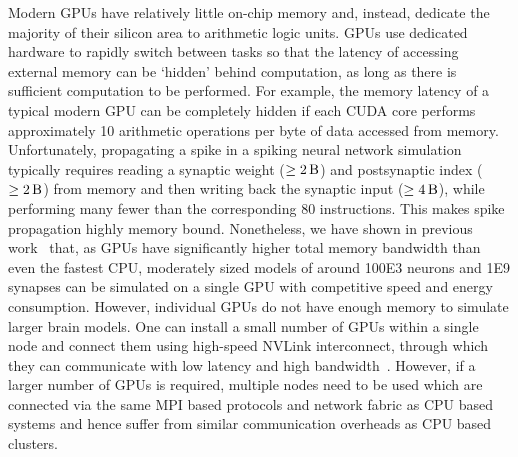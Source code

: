 \documentclass[9pt,a4paper]{amsart}
\begin{document}
Modern GPUs have relatively little on-chip memory and, instead, dedicate the majority of their silicon area to arithmetic logic units.
GPUs use dedicated hardware to rapidly switch between tasks so that the latency of accessing external memory can be `hidden' behind computation, as long as there is sufficient computation to be performed.
For example, the memory latency of a typical modern GPU can be completely hidden if each CUDA core performs approximately 10 arithmetic operations per byte of data accessed from memory.
Unfortunately, propagating a spike in a spiking neural network simulation typically requires reading a synaptic weight ($\ge \SI{2}{\byte}$) and postsynaptic index ($\ge \SI{2}{\byte}$) from memory and then writing back the synaptic input ($\ge \SI{4}{\byte}$), while performing many fewer than the corresponding 80 instructions. 
This makes spike propagation highly memory bound.
Nonetheless, we have shown in previous work~\citep{Knight2018} that, as GPUs have significantly higher total memory bandwidth than even the fastest CPU, moderately sized models of around \num{100E3} neurons and \num{1E9} synapses can be simulated on a single GPU with competitive speed and energy consumption.
However, individual GPUs do not have enough memory to simulate larger brain models.
One can install a small number of GPUs within a single node and connect them using high-speed NVLink interconnect, through which they can communicate with low latency and high bandwidth~\citep{Li2020}.
However, if a larger number of GPUs is required, multiple nodes need to be used which are connected via the same MPI based protocols and network fabric as CPU based systems and hence suffer from similar communication overheads as CPU based clusters.
\end{document}
